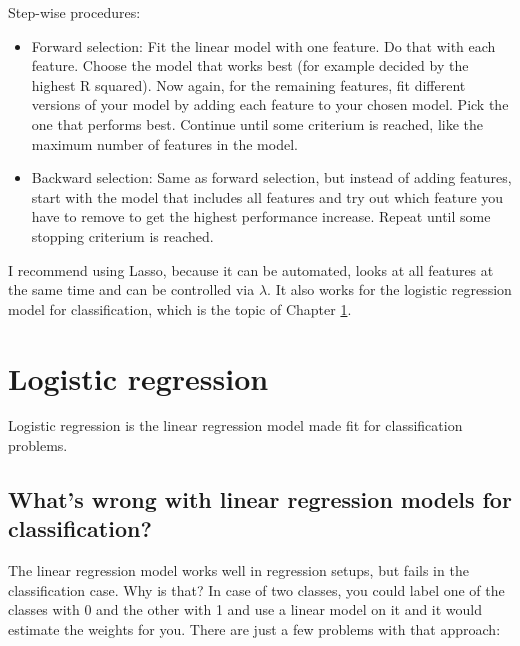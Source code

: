 \documentclass[12pt,]{krantz}
\providecommand{\tightlist}{%
  \setlength{\itemsep}{0pt}\setlength{\parskip}{0pt}}
\theoremstyle{definition}
\theoremstyle{definition}
\theoremstyle{definition}
\theoremstyle{remark}
\begin{document}
Step-wise procedures:

\begin{itemize}
\tightlist
\item
  Forward selection: Fit the linear model with one feature. Do that with
  each feature. Choose the model that works best (for example decided by
  the highest R squared). Now again, for the remaining features, fit
  different versions of your model by adding each feature to your chosen
  model. Pick the one that performs best. Continue until some criterium
  is reached, like the maximum number of features in the model.
\item
  Backward selection: Same as forward selection, but instead of adding
  features, start with the model that includes all features and try out
  which feature you have to remove to get the highest performance
  increase. Repeat until some stopping criterium is reached.
\end{itemize}

I recommend using Lasso, because it can be automated, looks at all
features at the same time and can be controlled via \(\lambda\). It also
works for the logistic regression model for classification, which is the
topic of Chapter \ref{logistic}.

\section{Logistic regression}\label{logistic}

Logistic regression is the linear regression model made fit for
classification problems.

\subsection{What's wrong with linear regression models for
classification?}\label{whats-wrong-with-linear-regression-models-for-classification}

The linear regression model works well in regression setups, but fails
in the classification case. Why is that? In case of two classes, you
could label one of the classes with 0 and the other with 1 and use a
linear model on it and it would estimate the weights for you. There are
just a few problems with that approach:
\end{document}
